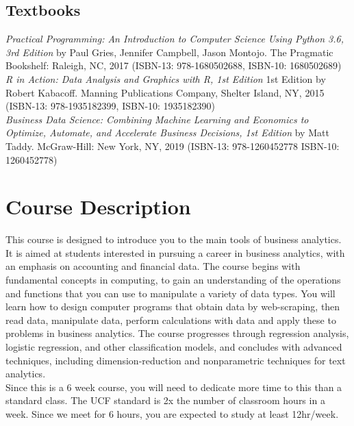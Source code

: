 \documentclass[11pt]{paper}
\begin{document}
\subsection*{Textbooks}
\textit{Practical Programming: An Introduction to Computer Science Using Python 3.6, 3rd Edition} by Paul Gries, Jennifer Campbell, Jason Montojo. The Pragmatic Bookshelf: Raleigh, NC, 2017 (ISBN-13: 978-1680502688, ISBN-10: 1680502689)\\

\textit{R in Action: Data Analysis and Graphics with R, 1st Edition} 1st Edition by Robert Kabacoff. Manning Publications Company, Shelter Island, NY, 2015 (ISBN-13: 978-1935182399, ISBN-10: 1935182390)\\

\textit{Business Data Science: Combining Machine Learning and Economics to Optimize, Automate, and Accelerate Business Decisions, 1st Edition} by Matt Taddy. McGraw-Hill: New York, NY, 2019 (ISBN-13: 978-1260452778 ISBN-10: 1260452778)\\

  
\section*{Course Description}
This course is designed to introduce you to the main tools of business analytics. It is aimed at students interested in pursuing a career in business analytics, with an emphasis on accounting and financial data. The course begins with fundamental concepts in computing, to gain an understanding of the operations and functions that you can use to manipulate a variety of data types. You will learn how to design computer programs that obtain data by web-scraping, then read data, manipulate data, perform calculations with data and apply these to problems in business analytics. The course progresses through regression analysis, logistic regression, and other classification models, and concludes with advanced techniques, including dimension-reduction and nonparametric techniques for text analytics. \\

Since this is a 6 week course, you will need to dedicate more time to this than a standard class. The UCF standard is 2x the number of classroom hours in a week. Since we meet for 6 hours, you are expected to study at least 12hr/week.
\end{document}
